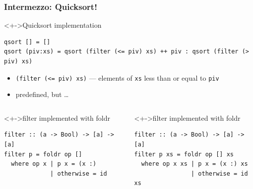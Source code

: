 \documentclass{beamer}
\begin{document}
\begin{frame}
  \frametitle{Intermezzo: Quicksort!}
  \begin{exampleblock}<+->{Quicksort implementation}
\begin{lstlisting}
qsort [] = []
qsort (piv:xs) = qsort (filter (<= piv) xs) ++ piv : qsort (filter (> piv) xs)
\end{lstlisting}
  \end{exampleblock}
  \begin{itemize}
  \item \lstinline{(filter (<= piv) xs)} --- elements of \lstinline{xs}
    less than or equal to \lstinline{piv}
  \item predefined, but \dots
  \end{itemize}
  \begin{columns}
    \begin{column}{0.49\linewidth}
  \begin{exampleblock}<+->{filter implemented with foldr}
\begin{lstlisting}
filter :: (a -> Bool) -> [a] -> [a]
filter p = foldr op []
  where op x | p x = (x :)
             | otherwise = id
\end{lstlisting}
  \end{exampleblock}
\end{column}
    \begin{column}{0.49\linewidth}
  \begin{exampleblock}<+->{filter implemented with foldr}
\begin{lstlisting}
filter :: (a -> Bool) -> [a] -> [a]
filter p xs = foldr op [] xs
  where op x xs | p x = (x :) xs
                | otherwise = id xs
\end{lstlisting}
  \end{exampleblock}
\end{column}

  \end{columns}
\end{frame}
\end{document}
